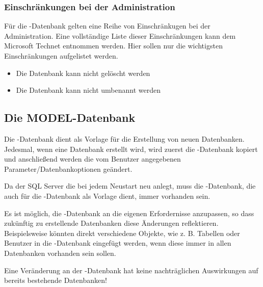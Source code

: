         \subsubsection{Einschränkungen bei der Administration}
          Für die -Datenbank gelten eine Reihe von
          Einschränkugen bei der Administration. Eine vollständige Liste dieser
          Einschränkungen kann dem Microsoft Technet entnommen werden. Hier
          sollen nur die wichtigsten Einschränkungen aufgelistet werden.
          \begin{itemize}
            \item Die Datenbank kann nicht gelöscht werden
            \item Die Datenbank kann nicht umbenannt werden
          \end{itemize}
          \begin{literaturinternet}
            \item \cite{ms187112}
          \end{literaturinternet} 
      \subsection{Die MODEL-Datenbank}
        Die -Datenbank dient als Vorlage für die Erstellung
        von neuen Datenbanken. Jedesmal, wenn eine Datenbank erstellt wird, wird
        zuerst die -Datenbank kopiert und anschließend werden
        die vom Benutzer angegebenen Parameter/Datenbankoptionen geändert.
        \begin{merke}
          Da der SQL Server die  bei jedem Neustart neu
          anlegt, muss die -Datenbank, die auch für die
          -Datenbank als Vorlage dient, immer vorhanden sein.
        \end{merke}
        Es ist möglich, die -Datenbank an die
        eigenen Erfordernisse anzupassen, so dass zukünftig zu erstellende
        Datenbanken diese Änderungen reflektieren. Beispielsweise
        könnten direkt verschiedene Objekte, wie z. B. Tabellen oder Benutzer in
        die -Datenbank eingefügt werden, wenn diese immer in
        allen Datenbanken vorhanden sein sollen.
        \begin{merke}
          Eine Veränderung an der -Datenbank hat keine
          nachträglichen Auswirkungen auf bereits bestehende Datenbanken!
        \end{merke}
